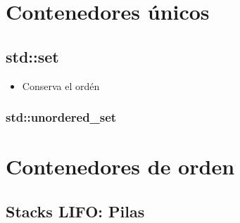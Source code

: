 \documentclass[12pt, fleqn]{report}                             %
\theoremstyle{break}                                            %
\begin{document}
    \clearpage
    \chapter{Contenedores únicos}
    
        \section{std::set}

            \begin{itemize}
                \item Conserva el ordén
            \end{itemize}


            \subsection{std::unordered\_set}


    \clearpage
    \chapter{Contenedores de orden}
                
        \clearpage
        \section{Stacks LIFO: Pilas}
\end{document}
